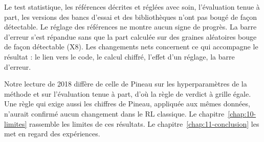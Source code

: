 Le test statistique, les références décrites et réglées avec soin, l'évaluation tenue à part, les
versions des bancs d'essai et des bibliothèques n'ont pas bougé de façon détectable. Le réglage des
références ne montre aucun signe de progrès. La barre d'erreur s'est répandue sans que la part
calculée sur des graines aléatoires bouge de façon détectable (X8). Les changements nets concernent ce
qui accompagne le résultat : le lien vers le code, le calcul chiffré, l'effet d'un réglage, la barre
d'erreur.

Notre lecture de 2018 diffère de celle de Pineau sur les hyperparamètres de la méthode et sur
l'évaluation tenue à part, d'où la règle de verdict à grille égale. Une règle qui exige aussi les
chiffres de Pineau, appliquée aux mêmes données, n'aurait confirmé aucun changement dans le RL classique. Le
chapitre~\ref{chap:10-limites} rassemble les limites de ces résultats. Le
chapitre~\ref{chap:11-conclusion} les met en regard des expériences.

